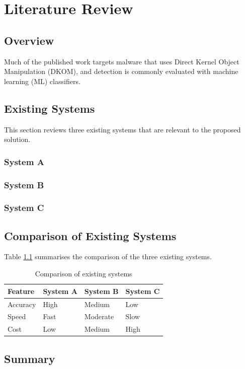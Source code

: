 \chapter{Literature Review}\label{ch2:literature}

\section{Overview}
\lipsum[5-6] \citep{dummy2019article} Much of the published work
targets malware that uses Direct Kernel Object Manipulation
(DKOM), and detection is commonly evaluated with machine learning
(ML) classifiers.

\section{Existing Systems}
This section reviews three existing systems that are relevant to the proposed solution.

\subsection{System A}
\lipsum[7]

\subsection{System B}
\lipsum[8]

\subsection{System C}
\lipsum[9]

\section{Comparison of Existing Systems}
Table \ref{tab:comparison} summarises the comparison of the three existing systems.

\begin{table}[htbp]
\caption{Comparison of existing systems}
\label{tab:comparison}
\begin{tabularx}{\textwidth}{@{} l l l l @{}}
\toprule
Feature & System A & System B & System C \\
\midrule
Accuracy & High & Medium & Low \\
Speed & Fast & Moderate & Slow \\
Cost & Low & Medium & High \\
\bottomrule
\end{tabularx}
\end{table}

\section{Summary}
\lipsum[10]
